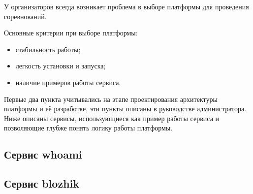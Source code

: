 У организаторов всегда возникает проблема в выборе платформы для проведения соревнований.

Основные критерии при выборе платформы:
\begin{itemize} 
\item стабильность работы;
\item легкость установки и запуска;
\item наличие примеров работы сервиса.
\end{itemize}

Первые два пункта учитывались на этапе проектирования архитектуры платформы и её разработке, эти пункты описаны в руководстве администратора.
Ниже описаны сервисы, использующиеся как пример работы сервиса и позволяющие глубже понять логику работы платформы. 

\subsection{Сервис whoami}


\subsection{Сервис blozhik}
